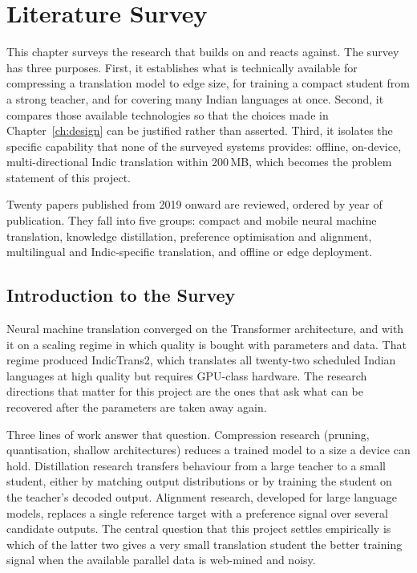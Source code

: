 \chapter{Literature Survey}
\label{ch:literature}

This chapter surveys the research that \setu{} builds on and reacts against.
The survey has three purposes. First, it establishes what is technically
available for compressing a translation model to edge size, for training a
compact student from a strong teacher, and for covering many Indian languages at
once. Second, it compares those available technologies so that the choices made
in Chapter~\ref{ch:design} can be justified rather than asserted. Third, it
isolates the specific capability that none of the surveyed systems provides:
offline, on-device, multi-directional Indic translation within 200\,MB, which
becomes the problem statement of this project.

Twenty papers published from 2019 onward are reviewed, ordered by year of
publication. They fall into five groups: compact and mobile neural machine
translation, knowledge distillation, preference optimisation and alignment,
multilingual and Indic-specific translation, and offline or edge deployment.

\section{Introduction to the Survey}
\label{sec:litintro}

Neural machine translation converged on the Transformer architecture, and with
it on a scaling regime in which quality is bought with parameters and data.
That regime produced IndicTrans2, which translates all twenty-two scheduled
Indian languages at high quality but requires GPU-class hardware. The research
directions that matter for this project are the ones that ask what can be
recovered after the parameters are taken away again.

Three lines of work answer that question. Compression research (pruning,
quantisation, shallow architectures) reduces a trained model to a size a
device can hold. Distillation research transfers behaviour from a large teacher
to a small student, either by matching output distributions or by training the
student on the teacher's decoded output. Alignment research, developed for large
language models, replaces a single reference target with a preference signal
over several candidate outputs. The central question that this project settles
empirically is which of the latter two gives a very small translation student
the better training signal when the available parallel data is web-mined and
noisy.

